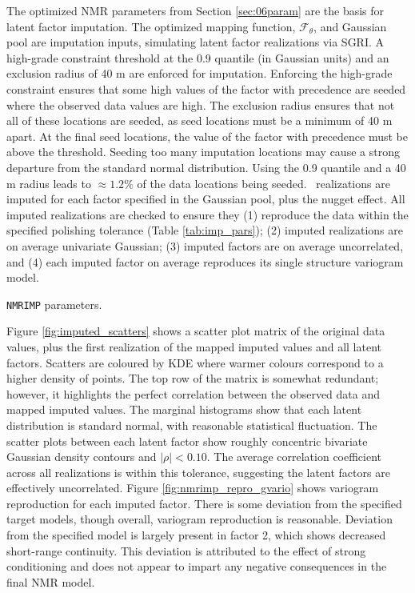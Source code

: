 The optimized \gls{NMR} parameters from Section \ref{sec:06param} are the basis for latent factor imputation. The optimized mapping function, $\mathcal{F}_{\theta}$, and Gaussian pool are imputation inputs, simulating latent factor realizations via \gls{SGRI}. A high-grade constraint threshold at the 0.9 quantile (in Gaussian units) and an exclusion radius of 40 m are enforced for imputation. Enforcing the high-grade constraint ensures that some high values of the factor with precedence are seeded where the observed data values are high. The exclusion radius ensures that not all of these locations are seeded, as seed locations must be a minimum of 40 m apart. At the final seed locations, the value of the factor with precedence must be above the threshold. Seeding too many imputation locations may cause a strong departure from the standard normal distribution. Using the 0.9 quantile and a 40 m radius leads to $\approx 1.2\%$ of the data locations being seeded. \csnreals \ realizations are imputed for each factor specified in the Gaussian pool, plus the nugget effect. All imputed realizations are checked to ensure they (1) reproduce the data within the specified polishing tolerance (Table \ref{tab:imp_pars}); (2) imputed realizations are on average univariate Gaussian; (3) imputed factors are on average uncorrelated, and (4) each imputed factor on average reproduces its single structure variogram model.

\begin{table}[!htb]
    \centering
    \caption{\texttt{NMRIMP} parameters.}
    \resizebox{0.9\width}{!}{}
    \label{tab:imp_pars}
\end{table}

Figure \ref{fig:imputed_scatters} shows a scatter plot matrix of the original data values, plus the first realization of the mapped imputed values and all latent factors. Scatters are coloured by \gls{KDE} where warmer colours correspond to a higher density of points. The top row of the matrix is somewhat redundant; however, it highlights the perfect correlation between the observed data and mapped imputed values. The marginal histograms show that each latent distribution is standard normal, with reasonable statistical fluctuation. The scatter plots between each latent factor show roughly concentric bivariate Gaussian density contours and $|\rho| < 0.10$. The average correlation coefficient across all realizations is within this tolerance, suggesting the latent factors are effectively uncorrelated. Figure \ref{fig:nmrimp_repro_gvario} shows variogram reproduction for each imputed factor. There is some deviation from the specified target models, though overall, variogram reproduction is reasonable. Deviation from the specified model is largely present in factor 2, which shows decreased short-range continuity. This deviation is attributed to the effect of strong conditioning and does not appear to impart any negative consequences in the final \gls{NMR} model.

